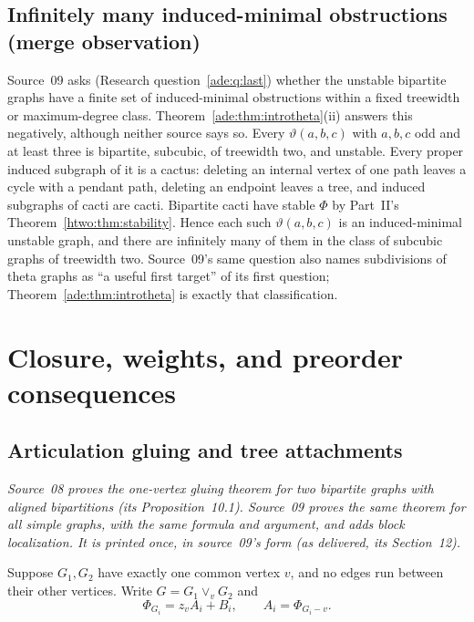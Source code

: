 \documentclass[11pt]{article}
\numberwithin{equation}{section}
\theoremstyle{definition}
\begin{document}
\subsection{Infinitely many induced-minimal obstructions (merge observation)}
\label{ade:sec:inducedminimal}
Source~09 asks (Research question~\ref{ade:q:last}) whether the unstable
bipartite graphs have a finite set of induced-minimal obstructions within a
fixed treewidth or maximum-degree class. Theorem~\ref{ade:thm:introtheta}(ii)
answers this negatively, although neither source says so. Every
$\vartheta(a,b,c)$ with $a,b,c$ odd and at least three is bipartite,
subcubic, of treewidth two, and unstable. Every proper induced subgraph of
it is a cactus: deleting an internal vertex of one path leaves a cycle with
a pendant path, deleting an endpoint leaves a tree, and induced subgraphs of
cacti are cacti. Bipartite cacti have stable $\Phi$ by Part~II's
Theorem~\ref{htwo:thm:stability}. Hence each such $\vartheta(a,b,c)$ is an
induced-minimal unstable graph, and there are infinitely many of them in the
class of subcubic graphs of treewidth two. Source~09's same question also
names subdivisions of theta graphs as ``a useful first target'' of its first
question; Theorem~\ref{ade:thm:introtheta} is exactly that classification.

\section{Closure, weights, and preorder consequences}
\label{ade:sec:consequences}

\subsection{Articulation gluing and tree attachments}

\noindent\emph{Source~08 proves the one-vertex gluing theorem for two
bipartite graphs with aligned bipartitions (its Proposition~10.1). Source~09
proves the same theorem for all simple graphs, with the same formula and
argument, and adds block localization. It is printed once, in source~09's
form (as delivered, its Section~12).}

\label{ade:mat:sec:blocks}
Suppose $G_1,G_2$ have exactly one common vertex $v$, and no edges run
between their other vertices. Write $G=G_1\vee_vG_2$ and
\[
 \Phi_{G_i}=z_v A_i+B_i,\qquad A_i=\Phi_{G_i-v}.
\]
\end{document}
